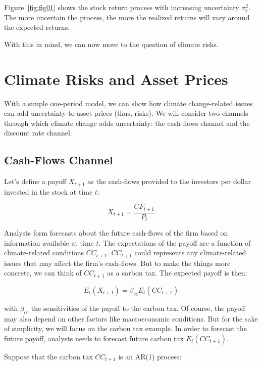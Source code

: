 Figure~\ref{fig:fig01} shows the stock return process
with increasing uncertainty $\sigma_{\varepsilon}^2$.
The more uncertain the process, the more
the realized returns will vary around the
expected returns. 

With this in mind, we can now move to the question 
of climate risks. 

\section{Climate Risks and Asset Prices}

With a simple one-period model, we can
show how climate change-related issues can add uncertainty
to asset prices (thus, risks).
We will consider two channels through which
climate change adds uncertainty: the cash-flows channel
and the discount rate channel.

\subsection{Cash-Flows Channel}

Let's define a payoff $X_{t+1}$ as the 
cash-flows provided to the investors per dollar invested in the stock at time $t$:

\begin{equation}
    X_{t+1} = \frac{CF_{t+1}}{P_t}
\end{equation}

Analysts form forecasts 
about the future cash-flows of the firm
based on information available at time $t$.
The expectations of the payoff
are a function of climate-related
conditions $CC_{t+1}$. $CC_{t+1}$ could represents 
any climate-related issues that may affect the
firm's cash-flows. But to make the things more 
concrete, we can think of $CC_{t+1}$ as 
a carbon tax. 
The expected payoff is then:

\begin{equation}
    E_t(X_{t+1}) = \beta_{cc} E_t(CC_{t+1})
\end{equation}

with $\beta_{cc}$ the sensitivities of 
the payoff to the carbon tax. Of course,
the payoff may also depend on other factors
like macroeconomic conditions. But 
for the sake of simplicity, we will focus
on the carbon tax example.
In order to forecast the future payoff, analysts 
needs to forecast future carbon tax
$E_t(CC_{t+1})$.

Suppose that the carbon tax $CC_{t+1}$ is an AR(1) process:

